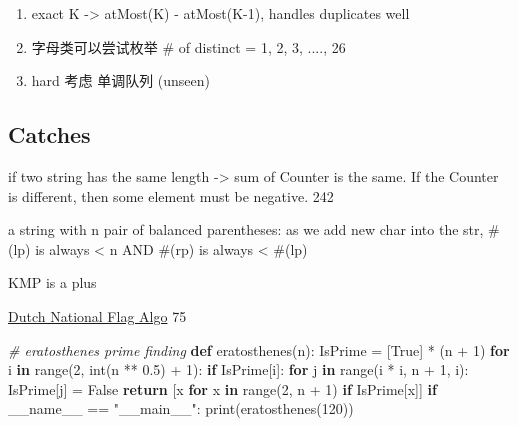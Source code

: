 \documentclass[
]{article}
\newenvironment{Shaded}{}{}
\newcommand{\BuiltInTok}[1]{#1}
\newcommand{\CommentTok}[1]{\textcolor[rgb]{0.38,0.63,0.69}{\textit{#1}}}
\newcommand{\ControlFlowTok}[1]{\textcolor[rgb]{0.00,0.44,0.13}{\textbf{#1}}}
\newcommand{\DecValTok}[1]{\textcolor[rgb]{0.25,0.63,0.44}{#1}}
\newcommand{\FloatTok}[1]{\textcolor[rgb]{0.25,0.63,0.44}{#1}}
\newcommand{\KeywordTok}[1]{\textcolor[rgb]{0.00,0.44,0.13}{\textbf{#1}}}
\newcommand{\NormalTok}[1]{#1}
\newcommand{\OperatorTok}[1]{\textcolor[rgb]{0.40,0.40,0.40}{#1}}
\newcommand{\StringTok}[1]{\textcolor[rgb]{0.25,0.44,0.63}{#1}}
\newcommand{\VariableTok}[1]{\textcolor[rgb]{0.10,0.09,0.49}{#1}}
\begin{document}
\begin{enumerate}
\def\labelenumi{\arabic{enumi}.}
\item
  exact K -\textgreater{} atMost(K) - atMost(K-1), handles duplicates
  well
\item
  字母类可以尝试枚举 \# of distinct = 1, 2, 3, ...., 26
\item
  hard 考虑 单调队列 (unseen)
\end{enumerate}

\hypertarget{catches}{%
\subsection{Catches}\label{catches}}

if two string has the same length -\textgreater{} sum of Counter is the
same. If the Counter is different, then some element must be negative.
242

a string with n pair of balanced parentheses: as we add new char into
the str, \#(lp) is always \textless{} n AND \#(rp) is always \textless{}
\#(lp)

KMP is a plus

\href{https://www.geeksforgeeks.org/sort-an-array-of-0s-1s-and-2s/}{Dutch
National Flag Algo} 75

\begin{Shaded}
\begin{Highlighting}[]
\CommentTok{\# eratosthenes prime finding}
\KeywordTok{def}\NormalTok{ eratosthenes(n):}
\NormalTok{    IsPrime }\OperatorTok{=}\NormalTok{ [}\VariableTok{True}\NormalTok{] }\OperatorTok{*}\NormalTok{ (n }\OperatorTok{+} \DecValTok{1}\NormalTok{)}
    \ControlFlowTok{for}\NormalTok{ i }\KeywordTok{in} \BuiltInTok{range}\NormalTok{(}\DecValTok{2}\NormalTok{, }\BuiltInTok{int}\NormalTok{(n }\OperatorTok{**} \FloatTok{0.5}\NormalTok{) }\OperatorTok{+} \DecValTok{1}\NormalTok{):}
        \ControlFlowTok{if}\NormalTok{ IsPrime[i]:}
            \ControlFlowTok{for}\NormalTok{ j }\KeywordTok{in} \BuiltInTok{range}\NormalTok{(i }\OperatorTok{*}\NormalTok{ i, n }\OperatorTok{+} \DecValTok{1}\NormalTok{, i):}
\NormalTok{                IsPrime[j] }\OperatorTok{=} \VariableTok{False}
    \ControlFlowTok{return}\NormalTok{ [x }\ControlFlowTok{for}\NormalTok{ x }\KeywordTok{in} \BuiltInTok{range}\NormalTok{(}\DecValTok{2}\NormalTok{, n }\OperatorTok{+} \DecValTok{1}\NormalTok{) }\ControlFlowTok{if}\NormalTok{ IsPrime[x]]}
\ControlFlowTok{if} \VariableTok{\_\_name\_\_} \OperatorTok{==} \StringTok{"\_\_main\_\_"}\NormalTok{:}
    \BuiltInTok{print}\NormalTok{(eratosthenes(}\DecValTok{120}\NormalTok{))}
\end{Highlighting}
\end{Shaded}
\end{document}
